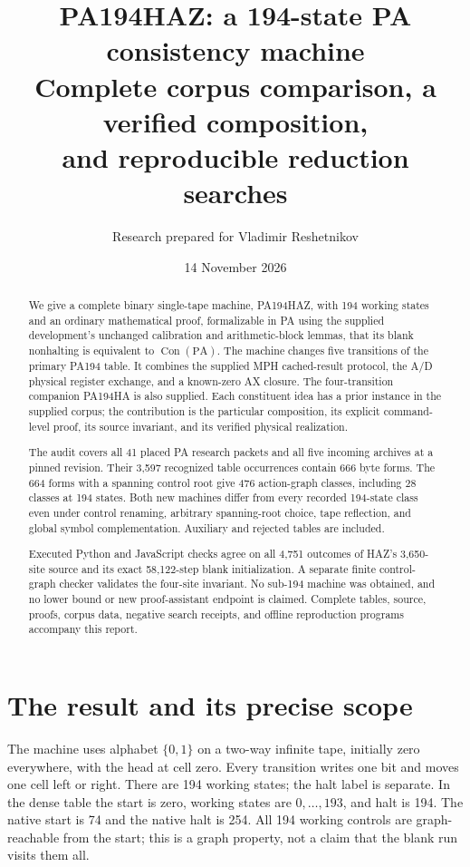 \documentclass[11pt]{article}
\title{PA194HAZ: a 194-state PA consistency machine\\
\large Complete corpus comparison, a verified composition,\\
and reproducible reduction searches}
\author{Research prepared for Vladimir Reshetnikov}
\date{14 November 2026}
\newcommand{\PA}{\mathrm{PA}}
\newcommand{\Con}{\operatorname{Con}}
\begin{document}
\maketitle
\begin{abstract}
We give a complete binary single-tape machine, PA194HAZ, with 194 working
states and an ordinary mathematical proof, formalizable in PA using the
supplied development's unchanged calibration and arithmetic-block lemmas,
that its blank nonhalting is equivalent to $\Con(\PA)$. The machine changes
five transitions of the primary PA194 table. It combines the supplied
MPH cached-result protocol, the A/D physical register exchange, and a
known-zero AX closure. The four-transition companion PA194HA is also supplied.
Each constituent idea has a prior instance in the supplied corpus; the
contribution is the particular composition, its explicit command-level
proof, its source invariant, and its verified physical realization.

The audit covers all 41 placed PA research packets and all five incoming
archives at a pinned revision. Their 3,597 recognized table occurrences
contain 666 byte forms. The 664 forms with a spanning control root give
476 action-graph classes, including 28 classes at 194 states. Both new
machines differ from every recorded 194-state class even under control
renaming, arbitrary spanning-root choice, tape reflection, and global
symbol complementation. Auxiliary and rejected tables are included.

Executed Python and JavaScript checks agree on all 4,751 outcomes of
HAZ's 3,650-site source and its exact 58,122-step blank initialization.
A separate finite control-graph checker validates the four-site invariant.
No sub-194 machine was obtained, and no lower bound or new proof-assistant
endpoint is claimed. Complete tables, source, proofs, corpus data, negative
search receipts, and offline reproduction programs accompany this report.
\end{abstract}
\clearpage
\tableofcontents
\newpage

\section{The result and its precise scope}

The machine uses alphabet $\{0,1\}$ on a two-way infinite tape, initially
zero everywhere, with the head at cell zero. Every transition writes one
bit and moves one cell left or right. There are 194 working states; the
halt label is separate. In the dense table the start is zero, working
states are $0,\ldots,193$, and halt is 194. The native start is 74 and the
native halt is 254. All 194 working controls are graph-reachable from the
start; this is a graph property, not a claim that the blank run visits them all.
\end{document}
